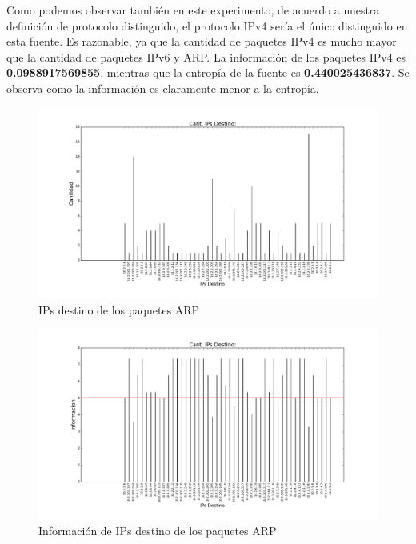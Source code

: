 Como podemos observar también en este experimento, de acuerdo a nuestra definición de protocolo distinguido, el protocolo IPv4 sería el único distinguido en esta fuente. Es razonable, ya que la cantidad de paquetes IPv4 es mucho mayor que la cantidad de paquetes IPv6 y ARP. La información de los paquetes IPv4 es \textbf{0.0988917569855}, mientras que la entropía de la fuente es \textbf{0.440025436837}. Se observa como la información es claramente menor a la entropía.

\begin{figure}[H]
       \centering
       \includegraphics[width=1\textwidth]{../resultados/labo-corrida3/histogram_dst.png}
       \caption{IPs destino de los paquetes ARP}
       \label{red-Starbucks-dst}
\end{figure}

\begin{figure}[H]
       \centering
       \includegraphics[width=1\textwidth]{../resultados/labo-corrida3/histogram_dst_information.png}
       \caption{Información de IPs destino de los paquetes ARP}
       \label{red-Starbucks-dst-information}
\end{figure}


